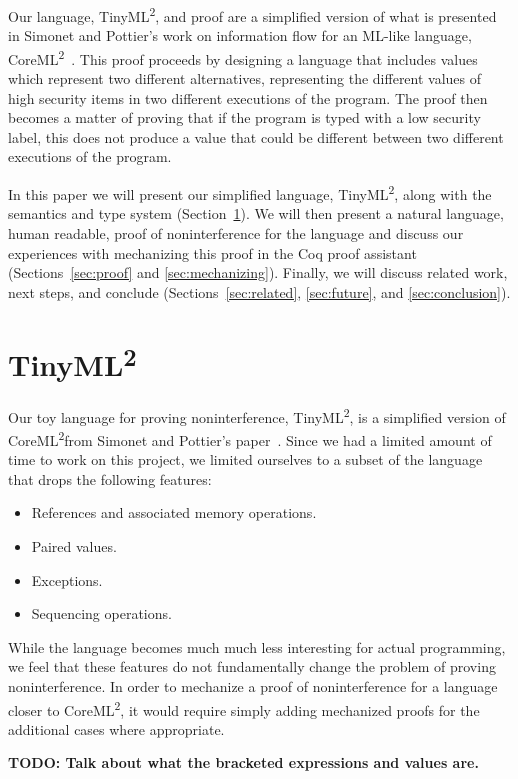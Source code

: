 \documentclass[a4paper]{article}
\newcommand{\langName}[0]{TinyML\textsuperscript{2}}
\newcommand{\origLang}[0]{CoreML\textsuperscript{2}}
\theoremstyle{plain}
\theoremstyle{definition}
\begin{document}
Our language, \langName,  and proof are a simplified version of what is
presented in Simonet and Pottier's work on information flow for an ML-like
language, \origLang~\cite{InfoFlowML}.  This proof proceeds by designing a
language that includes values which represent two different alternatives,
representing the different values of high security items in two different
executions of the program.  The proof then becomes a matter of proving that if
the program is typed with a low security label, this does not produce a value
that could be different between two different executions of the program.

In this paper we will present our simplified language, \langName,
along with the semantics and type system (Section~\ref{sec:lang}).  We will then
present a natural language, human readable, proof of noninterference for the
language and discuss our experiences with mechanizing this proof in the Coq
proof assistant (Sections~\ref{sec:proof} and \ref{sec:mechanizing}).  Finally,
we will discuss related work, next steps, and conclude
(Sections~\ref{sec:related}, \ref{sec:future}, and \ref{sec:conclusion}).

\section{\langName}
\label{sec:lang}

Our toy language for proving noninterference, \langName, is a simplified version
of \origLang from Simonet and Pottier's paper~\cite{InfoFlowML}.  Since we had a
limited amount of time to work on this project, we limited ourselves to a subset
of the language that drops the following features:

\begin{itemize}
  \item References and associated memory operations.
  \item Paired values.
  \item Exceptions.
  \item Sequencing operations.
\end{itemize}

While the language becomes much much less interesting for actual programming, we
feel that these features do not fundamentally change the problem of proving
noninterference.  In order to mechanize a proof of noninterference for a
language closer to \origLang, it would require simply adding mechanized proofs
for the additional cases where appropriate.

\textbf{TODO: Talk about what the bracketed expressions and values are.}
\end{document}
